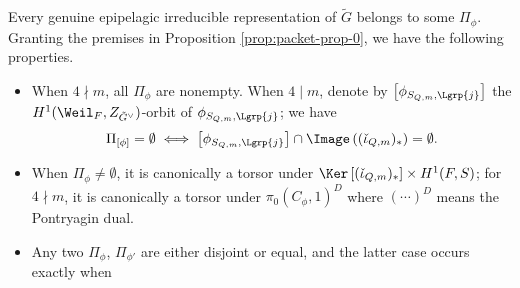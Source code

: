 \documentclass[a4paper,10pt]{article}
\begin{document}
\begin{theorem}\label{prop:L-packet-prop}
	Every genuine epipelagic irreducible representation of $\tilde{G}$ belongs to some $\Pi_\phi$. Granting the premises in Proposition \ref{prop:packet-prop-0}, we have the following properties.
	\begin{itemize}
		\item When $4 \nmid m$, all $\Pi_\phi$ are nonempty. When $4 \mid m$, denote by $\left[ \phi_{S_{Q,m}, \Lgrp{j}} \right]$ the $H^1(\Weil_F, Z_{\tilde{G}^\vee})$-orbit of $\phi_{S_{Q,m}, \Lgrp{j}}$; we have
			\[ \Pi_{[\phi]} = \emptyset \iff \left[ \phi_{S_{Q,m}, \Lgrp{j}} \right] \cap \Image\left( (\check{\iota}_{Q,m})_* \right) = \emptyset. \]
		\item When $\Pi_\phi \neq \emptyset$, it is canonically a torsor under $\Ker\left[ (\check{\iota}_{Q,m})_* \right] \times H^1(F, S)$; for $4 \nmid m$, it is canonically a torsor under $\pi_0(C_\phi, 1)^D$ where $(\cdots)^D$ means the Pontryagin dual.
		\item Any two $\Pi_{\phi}$, $\Pi_{\phi'}$ are either disjoint or equal, and the latter case occurs exactly when
	\end{itemize}
\end{theorem}
\end{document}
